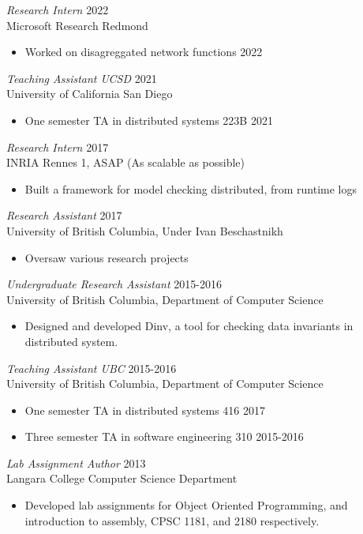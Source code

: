 \documentclass[line,margin]{res}
\begin{document}
\begin{resume}
{{\sl Research Intern} \hfill 2022\\
	Microsoft Research Redmond
\begin{itemize} \itemsep -2pt
        \item Worked on disagreggated network functions \hfill 2022
	\end{itemize}

{\sl Teaching Assistant UCSD} \hfill 2021\\
	University of California San Diego
\begin{itemize} \itemsep -2pt
        \item One semester TA in distributed systems 223B \hfill 2021
	\end{itemize}

{\sl Research Intern} \hfill 2017\\
    INRIA Rennes 1, ASAP (As scalable as possible)
\begin{itemize} \itemsep -2pt
        \item Built a framework for model checking distributed, from runtime logs
    \end{itemize}

{\sl Research Assistant} \hfill 2017\\
    University of British Columbia, Under Ivan Beschastnikh
\begin{itemize} \itemsep -2pt
        \item Oversaw various research projects
    \end{itemize}

{\sl Undergraduate Research Assistant} \hfill 2015-2016\\
	University of British Columbia, Department of Computer Science
\begin{itemize} \itemsep -2pt
        \item Designed and developed Dinv, a tool for checking data invariants in distributed system.
    \end{itemize}


{\sl Teaching Assistant UBC} \hfill 2015-2016\\
	University of British Columbia, Department of Computer Science
\begin{itemize} \itemsep -2pt
        \item One semester TA in distributed systems 416 \hfill 2017
		\item Three semester TA in software engineering 310 \hfill 2015-2016\\
	\end{itemize}
{\sl Lab Assignment Author} \hfill 2013\\
	Langara College Computer Science Department
	\begin{itemize} \itemsep -2pt
			\item Developed lab assignments for Object Oriented Programming, and introduction to assembly, CPSC 1181, and 2180 respectively.
	\end{itemize}
    

}
\end{resume}
\end{document}
